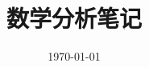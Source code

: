 \documentclass[UTF8,12pt,a4paper,fontset=fandol]{ctexbook}
\title{数学分析笔记}
\author{}
\date{\today}
\begin{document}
\frontmatter %


\raggedbottom

\maketitle
\tableofcontents
\clearpage

\mainmatter



% 
% 
% 
% 
% 
% 
% 
% 
% 
% 
% 
% 
% 
% 
% 
\end{document}
